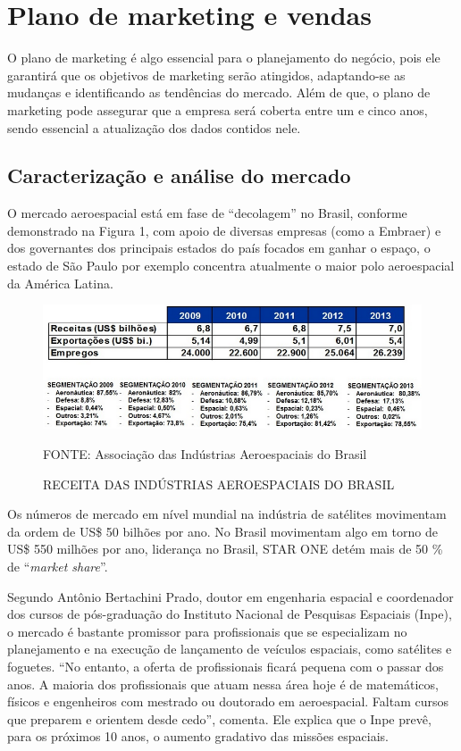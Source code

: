 \documentclass[
	12pt,				%
	openright,			%
	oneside,			%
	a4paper,			%
	english,			%
	french,				%
	spanish,			%
	brazil				%
	]{abntex2}
\begin{document}
\chapter[Plano de marketing e vendas]{Plano de marketing e vendas}

	O plano de marketing é algo essencial para o planejamento do negócio, pois ele garantirá que os objetivos de marketing serão atingidos, adaptando-se as mudanças e identificando as tendências do mercado. Além de que, o plano de marketing pode assegurar que a empresa será coberta entre um e cinco anos, sendo essencial a atualização dos dados contidos nele. 

\section[Caracterização e análise do mercado]{Caracterização e análise do mercado}

	O mercado aeroespacial está em fase de “decolagem” no Brasil, conforme demonstrado na Figura 1, com apoio de diversas empresas (como a Embraer) e dos governantes dos principais estados do país focados em ganhar o espaço, o estado de São Paulo por exemplo concentra atualmente o maior polo aeroespacial da América Latina.

	\begin{figure}[th]
		\caption{RECEITA DAS INDÚSTRIAS AEROESPACIAIS DO BRASIL}
		\centering
		\includegraphics[width=0.8\linewidth]{./figs/Figura_01a}
			
		\begin{small}
			FONTE: Associação das Indústrias Aeroespaciais do Brasil
		\end{small}		
	\end{figure}

	Os números de mercado em nível mundial na indústria de satélites movimentam da ordem de US\$ 50 bilhões por ano. 
No Brasil movimentam algo em torno de US\$ 550 milhões por ano, liderança no Brasil, STAR ONE detém mais de 50 \% de “\textit{market share}”.

	Segundo Antônio Bertachini Prado, doutor em engenharia espacial e coordenador dos cursos de pós-graduação do Instituto Nacional de Pesquisas Espaciais (Inpe), o mercado é bastante promissor para profissionais que se especializam no planejamento e na execução de lançamento de veículos espaciais, como satélites e foguetes. “No entanto, a oferta de profissionais ficará pequena com o passar dos anos. A maioria dos profissionais que atuam nessa área hoje é de matemáticos, físicos e engenheiros com mestrado ou doutorado em aeroespacial. Faltam cursos que preparem e orientem desde cedo”, comenta. Ele explica que o Inpe prevê, para os próximos 10 anos, o aumento gradativo das missões espaciais.
		
\end{document}
